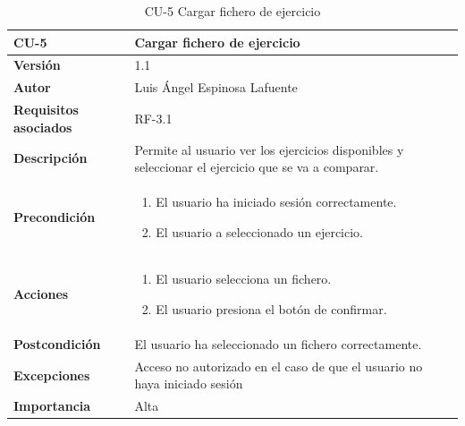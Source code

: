 \begin{table}[p]
	\centering
	\begin{tabularx}{\linewidth}{ p{} p{} }
		\toprule
		\textbf{CU-5}    & \textbf{Cargar fichero de ejercicio}\\
		\toprule
		\textbf{Versión}              & 1.1    \\
		\textbf{Autor}                &  Luis Ángel Espinosa Lafuente \\
		\textbf{Requisitos asociados} & RF-3.1\\
		\textbf{Descripción}          & Permite al usuario ver los ejercicios disponibles y seleccionar el ejercicio que se va a comparar.\\
		\textbf{Precondición}         & 
		\begin{enumerate}
			\def\labelenumi{\arabic{enumi}.}
			\tightlist
			 \item  El usuario ha iniciado sesión correctamente.
			\item El usuario a seleccionado un ejercicio. 
		\end{enumerate}\\
		\textbf{Acciones}             &
		\begin{enumerate}
			\def\labelenumi{\arabic{enumi}.}
			\tightlist
			\item El usuario selecciona un fichero.
			\item El usuario presiona el botón de confirmar.
		\end{enumerate}\\
		\textbf{Postcondición}        & El usuario ha seleccionado un fichero correctamente. \\
		\textbf{Excepciones}          & Acceso no autorizado en el caso de que el usuario no haya iniciado sesión \\
		\textbf{Importancia}          & Alta \\
		\bottomrule
	\end{tabularx}
	\caption{CU-5 Cargar fichero de ejercicio}
\end{table}


